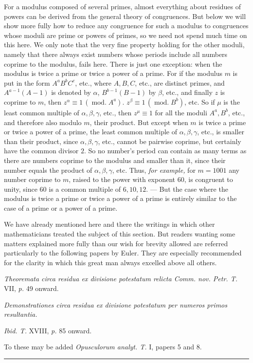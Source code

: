 For a modulus composed of several primes, almost everything about residues of powers can be derived from the general theory of congruences. But below we will show more fully how to reduce any congruence for such a modulus to congruences whose moduli are prime or powers of primes, so we need not spend much time on this here. We only note that the very fine property holding for the other moduli, namely that there always exist numbers whose periods include all numbers coprime to the modulus, fails here. There is just one exception: when the modulus is twice a prime or twice a power of a prime.
For if the modulus $m$ is put in the form $A^aB^bC^c$, etc., where $A,B,C$, etc., are distinct primes, and $A^{a-1}(A-1)$ is denoted by $\alpha$, $B^{b-1}(B-1)$ by $\beta$, etc., and finally $z$ is coprime to $m$, then $z^{\alpha}\equiv1\,(\operatorname{mod.}A^a)$. $z^{\beta}\equiv1\,(\operatorname{mod.}B^b)$, etc. So if $\mu$ is the least common multiple of $\alpha,\beta,\gamma$, etc., then $z^{\mu}\equiv1$ for all the moduli $A^a,B^b$, etc., and therefore also modulo $m$, their product. But except when $m$ is twice a prime or twice a power of a prime, the least common multiple of $\alpha,\beta,\gamma$, etc., is smaller than their product, since $\alpha,\beta,\gamma$, etc., cannot be pairwise coprime, but certainly have the common divisor $2$. So no number’s
period can contain as many terms as there are numbers coprime to the modulus and smaller than it, since their number equals the product of $\alpha,\beta,\gamma$, etc. Thus, \emph{for example,} for $m=1001$ any number coprime to $m$, raised to the power with exponent $60$, is congruent to unity, since $60$ is a common multiple of $6,10,12$. --- But the case where the modulus is twice a prime or twice a power of a prime is entirely similar to the case of a prime or a power of a prime.

We have already mentioned here and there the writings in which other mathematicians treated the subject of this section. But readers wanting some matters explained more fully than our wish for brevity allowed are referred particularly to the following papers by Euler. They are especially recommended for the clarity in which this great man always excelled above all others.

\emph{Theoremata circa residua ex divisione potestatum relicta Comm. nov. Petr. T.} VII, \emph{p.} 49 onward.

\emph{Demonstrationes circa residua ex divisione potestatum per numeros primos resultantia.}\par
\hspace*{\parindent}\emph{Ibid. T.} XVIII, \emph{p.} 85 onward.

To these may be added \emph{Opusculorum analyt. T.} I, papers 5 and 8.

\begin{center}\rule{.28\linewidth}{.25pt}\end{center}
